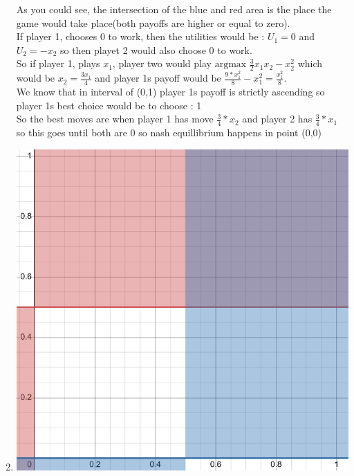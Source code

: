 \begin{latin}
\begin{enumerate}
\begin{center}
    \end{center}
    As you could see, the intersection of the blue and red area is the place the game would take place(both payoffs are higher or equal to zero).\\
    If player 1, chooses 0 to work, then the utilities would be : $U_1 = 0$ and $U_2 = -x_2$ so then playet 2 
    would also choose 0 to work. \\
    So if player 1, plays $x_1$, player two would play $\text{argmax } \frac{3}{2}x_1x_2 - x_2^2$ which would be $x_2 = \frac{3x_1}{4}$
    and player 1s payoff would be $\frac{9 * x_1^2}{8} - x_1^2 = \frac{ x_1^2}{8}$. \\
    We know that in interval of (0,1) player 1s payoff is strictly ascending so player 1s best choice would be to choose : 1\\
    So the best moves are when player 1 has move $\frac{3}{4} * x_2 $ and player 2 has $\frac{3}{4} * x_1$ so this goes until both are 0
    so nash equillibrium happens in point (0,0)
    \item  \phantom{text} \begin{center}
        \includegraphics[scale=0.3]{pics/graph2.png} 
        

\end{center}
\end{enumerate}
\end{latin}
